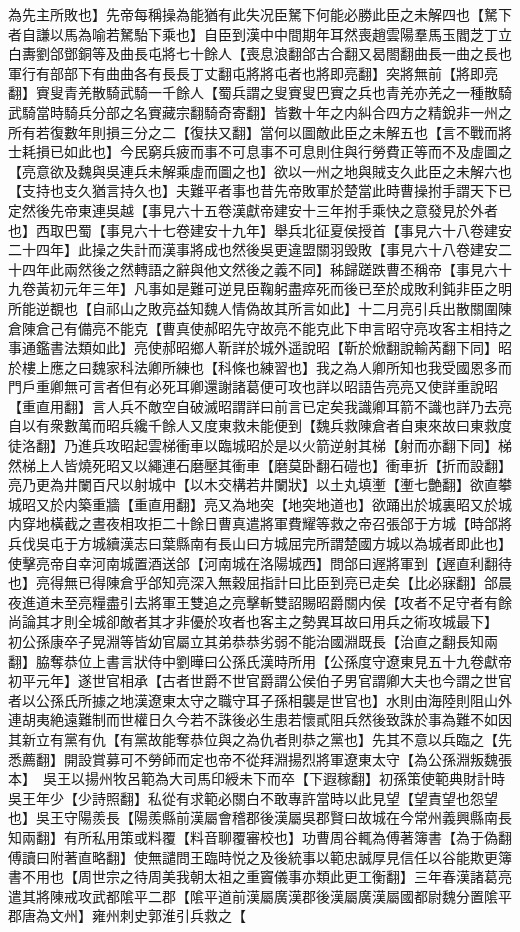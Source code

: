 為先主所敗也】先帝每稱操為能猶有此失况臣駑下何能必勝此臣之未解四也【駑下者自謙以馬為喻若駑駘下乘也】自臣到漢中中間期年耳然喪趙雲陽羣馬玉閻芝丁立白夀劉郃鄧銅等及曲長屯將七十餘人【喪息浪翻郃古合翻又曷閤翻曲長一曲之長也軍行有部部下有曲曲各有長長丁丈翻屯將將屯者也將即亮翻】突將無前【將即亮翻】賨叟青羌散騎武騎一千餘人【蜀兵謂之叟賨叟巴賨之兵也青羌亦羌之一種散騎武騎當時騎兵分部之名賨藏宗翻騎奇寄翻】皆數十年之内糾合四方之精銳非一州之所有若復數年則損三分之二【復扶又翻】當何以圖敵此臣之未解五也【言不戰而將士耗損已如此也】今民窮兵疲而事不可息事不可息則住與行勞費正等而不及虛圖之【亮意欲及魏與吳連兵未解乘虛而圖之也】欲以一州之地與賊支久此臣之未解六也【支持也支久猶言持久也】夫難平者事也昔先帝敗軍於楚當此時曹操拊手謂天下已定然後先帝東連吳越【事見六十五卷漢獻帝建安十三年拊手乘快之意發見於外者也】西取巴蜀【事見六十七卷建安十九年】舉兵北征夏侯授首【事見六十八卷建安二十四年】此操之失計而漢事將成也然後吳更違盟關羽毁敗【事見六十八卷建安二十四年此兩然後之然轉語之辭與他文然後之義不同】秭歸蹉跌曹丕稱帝【事見六十九卷黃初元年三年】凡事如是難可逆見臣鞠躬盡瘁死而後已至於成敗利鈍非臣之明所能逆覩也【自祁山之敗亮益知魏人情偽故其所言如此】十二月亮引兵出散關圍陳倉陳倉己有備亮不能克【曹真使郝昭先守故亮不能克此下申言昭守亮攻客主相持之事通鑑書法類如此】亮使郝昭鄉人靳詳於城外遥說昭【靳於焮翻說輸芮翻下同】昭於樓上應之曰魏家科法卿所練也【科條也練習也】我之為人卿所知也我受國恩多而門戶重卿無可言者但有必死耳卿還謝諸葛便可攻也詳以昭語告亮亮又使詳重說昭【重直用翻】言人兵不敵空自破滅昭謂詳曰前言已定矣我識卿耳箭不識也詳乃去亮自以有衆數萬而昭兵纔千餘人又度東救未能便到【魏兵救陳倉者自東來故曰東救度徒洛翻】乃進兵攻昭起雲梯衝車以臨城昭於是以火箭逆射其梯【射而亦翻下同】梯然梯上人皆燒死昭又以繩連石磨壓其衝車【磨莫卧翻石磑也】衝車折【折而設翻】亮乃更為井闌百尺以射城中【以木交構若井闌狀】以土丸填壍【壍七艶翻】欲直攀城昭又於内築重牆【重直用翻】亮又為地突【地突地道也】欲踊出於城裏昭又於城内穿地橫截之晝夜相攻拒二十餘日曹真遣將軍費耀等救之帝召張郃于方城【時郃將兵伐吳屯于方城續漢志曰葉縣南有長山曰方城屈完所謂楚國方城以為城者即此也】使擊亮帝自幸河南城置酒送郃【河南城在洛陽城西】問郃曰遟將軍到【遟直利翻待也】亮得無已得陳倉乎郃知亮深入無穀屈指計曰比臣到亮已走矣【比必寐翻】郃晨夜進道未至亮糧盡引去將軍王雙追之亮擊斬雙詔賜昭爵關内侯【攻者不足守者有餘尚論其才則全城卻敵者其才非優於攻者也客主之勢異耳故曰用兵之術攻城最下】　初公孫康卒子晃淵等皆幼官屬立其弟恭恭劣弱不能治國淵既長【治直之翻長知兩翻】脇奪恭位上書言狀侍中劉曄曰公孫氏漢時所用【公孫度守遼東見五十九卷獻帝初平元年】遂世官相承【古者世爵不世官爵謂公侯伯子男官謂卿大夫也今謂之世官者以公孫氏所據之地漢遼東太守之職守耳子孫相襲是世官也】水則由海陸則阻山外連胡夷絶遠難制而世權日久今若不誅後必生患若懷貳阻兵然後致誅於事為難不如因其新立有黨有仇【有黨故能奪恭位與之為仇者則恭之黨也】先其不意以兵臨之【先悉薦翻】開設賞募可不勞師而定也帝不從拜淵揚烈將軍遼東太守【為公孫淵叛魏張本】　吳王以揚州牧呂範為大司馬印綬未下而卒【下遐稼翻】初孫策使範典財計時吳王年少【少詩照翻】私從有求範必關白不敢專許當時以此見望【望責望也怨望也】吳王守陽羨長【陽羨縣前漢屬會稽郡後漢屬吳郡賢曰故城在今常州義興縣南長知兩翻】有所私用策或料覆【料音聊覆審校也】功曹周谷輒為傅著簿書【為于偽翻傅讀曰附著直略翻】使無譴問王臨時悦之及後統事以範忠誠厚見信任以谷能欺更簿書不用也【周世宗之待周美我朝太祖之重竇儀事亦類此更工衡翻】三年春漢諸葛亮遣其將陳戒攻武都隂平二郡【隂平道前漢屬廣漢郡後漢屬廣漢屬國都尉魏分置隂平郡唐為文州】雍州刺史郭淮引兵救之【